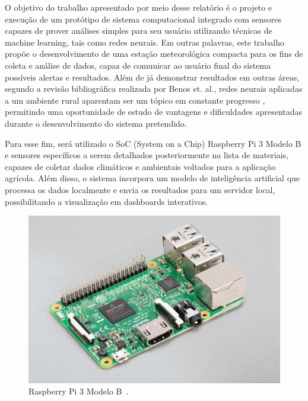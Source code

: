 O objetivo do trabalho apresentado por meio desse relatório é o projeto e execução de um protótipo de sistema computacional integrado com sensores capazes de prover análises simples para seu usuário utilizando técnicas de machine learning, tais como redes neurais. Em outras palavras, este trabalho propõe o desenvolvimento de uma estação meteorológica compacta para os fins de coleta e análise de dados, capaz de comunicar ao usuário final do sistema possíveis alertas e resultados. Além de já demonstrar resultados em outras áreas, segundo a revisão bibliográfica realizada por Benos et. al., redes neurais aplicadas a um ambiente rural aparentam ser um tópico em constante progresso \cite{machine_learning_in_agriculture}, permitindo uma oportunidade de estudo de vantagens e dificuldades apresentadas durante o desenvolvimento do sistema pretendido.

Para esse fim, será utilizado o SoC (System on a Chip) Raspberry Pi 3 Modelo B \cite{rpi3} e sensores específicos a serem detalhados posteriormente na lista de materiais, capazes de coletar dados climáticos e ambientais voltados para a aplicação agrícola. Além disso, o sistema incorpora um modelo de inteligência artificial que processa os dados localmente e envia os resultados para um servidor local, possibilitando a visualização em dashboards interativos.

\begin{figure}[!htpb]
    \centering
    \includegraphics[width=.9\columnwidth]{figuras/rpi3.jpg}
    \caption{Raspberry Pi 3 Modelo B~\cite{rpi3}.}
    \label{fig:rpi3}
\end{figure}

\newpage


